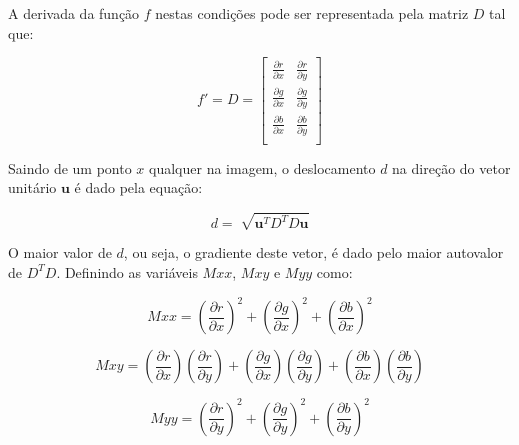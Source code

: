 A derivada da função $f$ nestas condições pode ser representada pela matriz $D$ tal que:

$$ f' = D = \begin{bmatrix} 
\frac{\partial r}{\partial x} & \frac{\partial r}{\partial y} \\
\frac{\partial g}{\partial x} & \frac{\partial g}{\partial y} \\
\frac{\partial b}{\partial x} & \frac{\partial b}{\partial y} \\ 
\end{bmatrix} $$

Saindo de um ponto $x$ qualquer na imagem, o deslocamento $d$ na direção do vetor unitário $\textbf{u}$ é dado pela equação:

$$d = \sqrt[]{\textbf{u}^TD^TD\textbf{u}}$$

O maior valor de $d$, ou seja, o gradiente deste vetor, é dado pelo maior autovalor de $D^TD$. Definindo as variáveis $Mxx$, $Mxy$ e $Myy$ como:







$$ Mxx = (\frac{\partial r}{\partial x})^2+(\frac{\partial g}{\partial x})^2+(\frac{\partial b}{\partial x})^2 $$

$$ Mxy =(\frac{\partial r}{\partial x})(\frac{\partial r}{\partial y})+(\frac{\partial g}{\partial x})(\frac{\partial g}{\partial y})+(\frac{\partial b}{\partial x})(\frac{\partial b}{\partial y}) $$

$$ Myy = (\frac{\partial r}{\partial y})^2+(\frac{\partial g}{\partial y})^2+(\frac{\partial b}{\partial y})^2 $$

